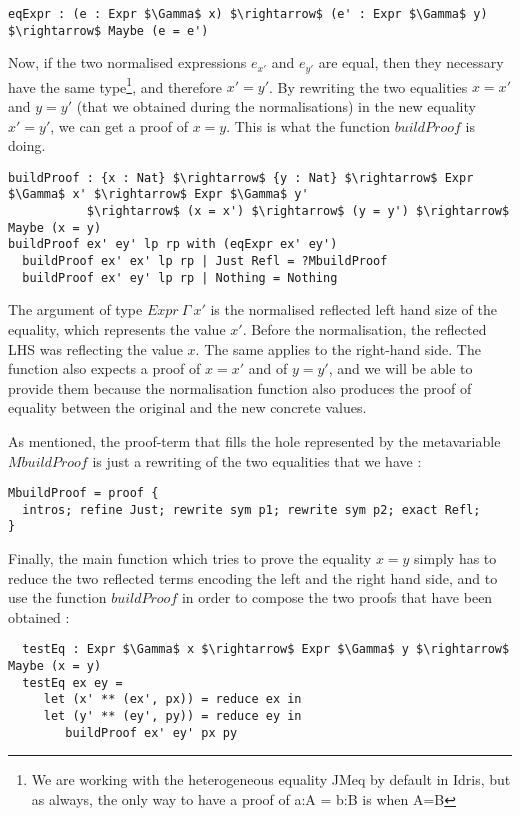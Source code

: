 \begin{lstlisting}
eqExpr : (e : Expr $\Gamma$ x) $\rightarrow$ (e' : Expr $\Gamma$ y) $\rightarrow$ Maybe (e = e')
\end{lstlisting}


Now, if the two normalised expressions $e_{x'}$ and $e_{y'}$ are equal, then they necessary have the same type\footnote{We are working with the heterogeneous equality JMeq by default in Idris, but as always, the only way to have a proof of a:A = b:B is when A=B}, and therefore $x'=y'$.
By rewriting the two equalities $x=x'$ and $y=y'$ (that we obtained during the normalisations) in the new equality $x'=y'$, we can get a proof of $x=y$. This is what the function $buildProof$ is doing.

\begin{lstlisting}
buildProof : {x : Nat} $\rightarrow$ {y : Nat} $\rightarrow$ Expr $\Gamma$ x' $\rightarrow$ Expr $\Gamma$ y' 
           $\rightarrow$ (x = x') $\rightarrow$ (y = y') $\rightarrow$ Maybe (x = y)
buildProof ex' ey' lp rp with (eqExpr ex' ey')
  buildProof ex' ex' lp rp | Just Refl = ?MbuildProof
  buildProof ex' ey' lp rp | Nothing = Nothing
\end{lstlisting}


The argument of type $Expr\ \Gamma\ x'$ is the normalised reflected left hand size of the equality, which represents the value $x'$. Before the normalisation, the reflected LHS was reflecting the value $x$. The same applies to the right-hand side. The function also expects a proof of $x=x'$ and of $y=y'$, and we will be able to provide them because the normalisation function also produces the proof of equality between the original and the new concrete values.

As mentioned, the proof-term that fills the hole represented by the metavariable $MbuildProof$ is just a rewriting of the two equalities that we have :

\begin{lstlisting}
MbuildProof = proof {
  intros; refine Just; rewrite sym p1; rewrite sym p2; exact Refl;
}  
\end{lstlisting}


Finally, the main function which tries to prove the equality $x=y$ simply has to reduce the two reflected terms encoding the left and the right hand side, and to use the function $buildProof$ in order to compose the two proofs that have been obtained :


\begin{lstlisting}
  testEq : Expr $\Gamma$ x $\rightarrow$ Expr $\Gamma$ y $\rightarrow$ Maybe (x = y)
  testEq ex ey = 
     let (x' ** (ex', px)) = reduce ex in 
     let (y' ** (ey', py)) = reduce ey in
        buildProof ex' ey' px py 
\end{lstlisting}


